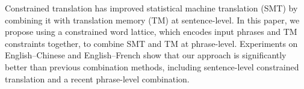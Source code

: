 Constrained translation has improved statistical machine translation (SMT) by combining it with translation memory (TM) at sentence-level. In this paper, we propose using a constrained word lattice, which encodes input phrases and TM constraints together, to combine SMT and TM at phrase-level. Experiments on English--Chinese and English--French show that our approach is significantly better than previous combination methods, including sentence-level constrained translation and a recent phrase-level combination.
